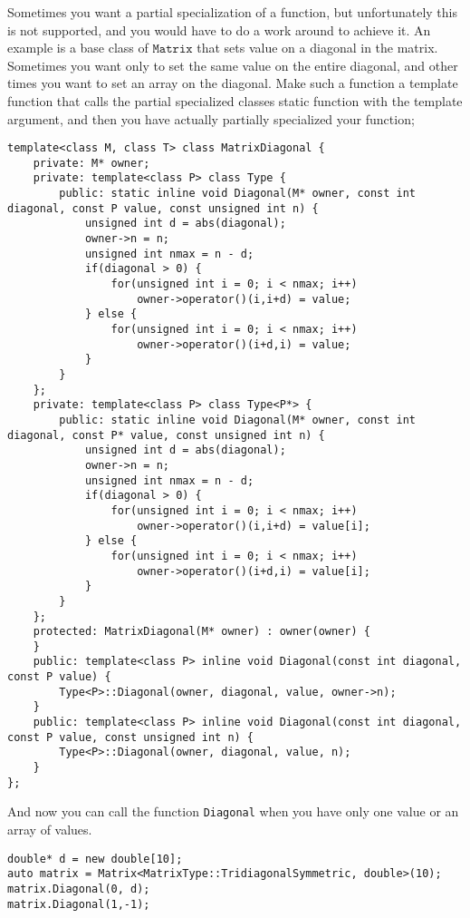 \documentclass[11pt,english,a4paper]{article}
\begin{document}
\begin{flushleft}
Sometimes you want a partial specialization of a function, but unfortunately this is not supported, and you would have to do a work around to achieve it. An example is a base class of $\texttt{Matrix}$ that sets value on a diagonal in the matrix. Sometimes you want only to set the same value on the entire diagonal, and other times you want to set an array on the diagonal. Make such a function a template function that calls the partial specialized classes static function with the template argument, and then you have actually partially specialized your function;

\begin{lstlisting}[title={The base class \texttt{MatrixDiagonal<M, T>}}]
template<class M, class T> class MatrixDiagonal {
    private: M* owner;
    private: template<class P> class Type {
        public: static inline void Diagonal(M* owner, const int diagonal, const P value, const unsigned int n) {
            unsigned int d = abs(diagonal);
            owner->n = n;
            unsigned int nmax = n - d;
            if(diagonal > 0) {
                for(unsigned int i = 0; i < nmax; i++)
                    owner->operator()(i,i+d) = value;
            } else {
                for(unsigned int i = 0; i < nmax; i++)
                    owner->operator()(i+d,i) = value;
            }
        }
    };
    private: template<class P> class Type<P*> {
        public: static inline void Diagonal(M* owner, const int diagonal, const P* value, const unsigned int n) {
            unsigned int d = abs(diagonal);
            owner->n = n;
            unsigned int nmax = n - d;
            if(diagonal > 0) {
                for(unsigned int i = 0; i < nmax; i++)
                    owner->operator()(i,i+d) = value[i];
            } else {
                for(unsigned int i = 0; i < nmax; i++)
                    owner->operator()(i+d,i) = value[i];
            }
        }
    };
    protected: MatrixDiagonal(M* owner) : owner(owner) {
    }
    public: template<class P> inline void Diagonal(const int diagonal, const P value) {
        Type<P>::Diagonal(owner, diagonal, value, owner->n);
    }
    public: template<class P> inline void Diagonal(const int diagonal, const P value, const unsigned int n) {
        Type<P>::Diagonal(owner, diagonal, value, n);
    }
};
\end{lstlisting} 

And now you can call the  function \texttt{Diagonal} when you have only one value or an array of values.  

\begin{lstlisting}[title={Example of usage of partial specialized \texttt{MatrixDiagonal<M, T>::Diagonal}}]
double* d = new double[10];
auto matrix = Matrix<MatrixType::TridiagonalSymmetric, double>(10);
matrix.Diagonal(0, d);
matrix.Diagonal(1,-1);
\end{lstlisting} 


\end{flushleft}
\end{document}
